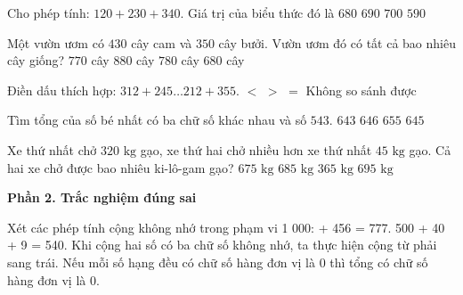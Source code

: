 \begin{ex} %
Cho phép tính: $120 + 230 + 340$. Giá trị của biểu thức đó là
\choice
{$680$}
{\True $690$}
{$700$}
{$590$}
\end{ex}

\begin{ex} %
Một vườn ươm có $430$ cây cam và $350$ cây bưởi. Vườn ươm đó có tất cả bao nhiêu cây giống?
\choice
{$770$ cây}
{$880$ cây}
{\True $780$ cây}
{$680$ cây}
\end{ex}

\begin{ex} %
Điền dấu thích hợp: $312 + 245 \dots 212 + 355$.
\choice
{\True $<$}
{$>$}
{$=$}
{Không so sánh được}
\end{ex}

\begin{ex} %
Tìm tổng của số bé nhất có ba chữ số khác nhau và số $543$.
\choice
{$643$}
{$646$}
{$655$}
{\True $645$}
\end{ex}

\begin{ex} %
Xe thứ nhất chở $320\text{ kg}$ gạo, xe thứ hai chở nhiều hơn xe thứ nhất $45\text{ kg}$ gạo. Cả hai xe chở được bao nhiêu ki-lô-gam gạo?
\choice
{$675\text{ kg}$}
{\True $685\text{ kg}$}
{$365\text{ kg}$}
{$695\text{ kg}$}
\end{ex}

\textbf{Phần 2. Trắc nghiệm đúng sai}

\begin{ex} %
Xét các phép tính cộng không nhớ trong phạm vi 1 000:
\choiceTF
{ + 456 = 777.}
{500 + 40 + 9 = 540.}
{\True Khi cộng hai số có ba chữ số không nhớ, ta thực hiện cộng từ phải sang trái.}
{\True Nếu mỗi số hạng đều có chữ số hàng đơn vị là 0 thì tổng có chữ số hàng đơn vị là 0.}
\end{ex}

